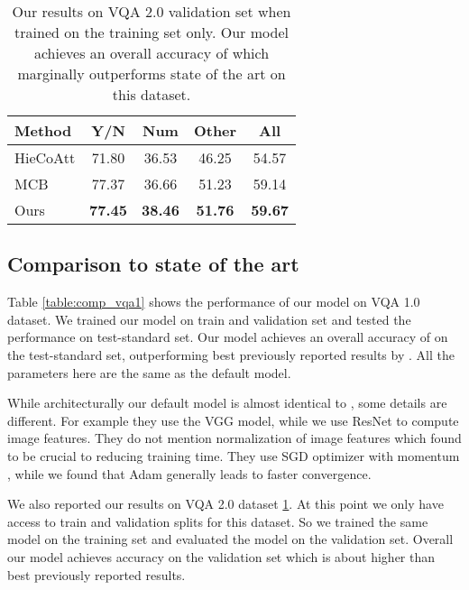 \documentclass[10pt,twocolumn,letterpaper]{article}
\begin{document}
\begin{table}
	\footnotesize
	\centering
	\tabcolsep=0.4cm
	\begin{tabular}{l c c c c}
		\toprule
		Method & Y/N & Num & Other & All \\ 
		\midrule
		HieCoAtt \cite{Lu2016HierarchicalQC} & 71.80 & 36.53 & 46.25 & 54.57 \\
		MCB \cite{Fukui2016MultimodalCB} & 77.37 & 36.66 & 51.23 & 59.14 \\
		\midrule
		Ours & \textbf{77.45} & \textbf{38.46} & \textbf{51.76} & \textbf{59.67} \\
		\bottomrule
	\end{tabular}
	\vspace{.1cm}
	\caption{Our results on VQA 2.0 \cite{Goyal2016MakingTV} validation set when trained on the training set only. Our model achieves an overall accuracy of  which marginally outperforms state of the art on this dataset.} 
	\label{table:comp_vqa2}
\end{table}

\subsection{Comparison to state of the art}
Table \ref{table:comp_vqa1} shows the performance of our model on VQA 1.0 dataset. We trained our model on train and validation set and tested the performance on test-standard set. Our model achieves an overall accuracy of  on the test-standard set, outperforming best previously reported results by . All the parameters here are the same as the default model. 

While architecturally our default model is almost identical to \cite{Yang2016StackedAN}, some details are different. For example they use the VGG \cite{Simonyan2014Very} model, while we use ResNet \cite{He2016DeepRL} to compute image features. They do not mention  normalization of image features which found to be crucial to reducing training time.
They use SGD optimizer with momentum , while we found that Adam \cite{Kingma2014AdamAM} generally leads to faster convergence. 

We also reported our results on VQA 2.0 dataset \ref{table:comp_vqa2}. At this point we only have access to train and validation splits for this dataset. So we trained the same model on the training set and evaluated the model on the validation set. Overall our model achieves  accuracy on the validation set which is about  higher than best previously reported results.
\end{document}
